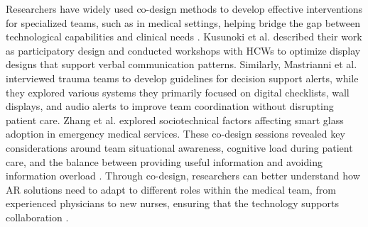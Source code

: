 Researchers have widely used co-design methods to develop effective interventions for specialized teams, such as in medical settings, helping bridge the gap between technological capabilities and clinical needs \cite{mastrianni2023transitioning, hoppchen2024insights, hsieh2023alternatives, shen2023dementia}. Kusunoki et al. \cite{kusunoki2015sketching} described their work as participatory design and conducted workshops with HCWs to optimize display designs that support verbal communication patterns. Similarly, Mastrianni et al. \cite{mastrianni2022alerts} interviewed trauma teams to develop guidelines for decision support alerts, while they explored various systems they primarily focused on digital checklists, wall displays, and audio alerts to improve team coordination without disrupting patient care. %
Zhang et al. \cite{zhang2022designing} explored sociotechnical factors affecting smart glass adoption in emergency medical services. %
These co-design sessions revealed key considerations around team situational awareness, cognitive load during patient care, and the balance between providing useful information and avoiding information overload \cite{mastrianni2022alerts, kusunoki2015sketching}. 
Through co-design, researchers can better understand how AR solutions need to adapt to different roles within the medical team, from experienced physicians to new nurses, ensuring that the technology supports collaboration \cite{sarcevic2011coordinating, chung2023negotiating}.



